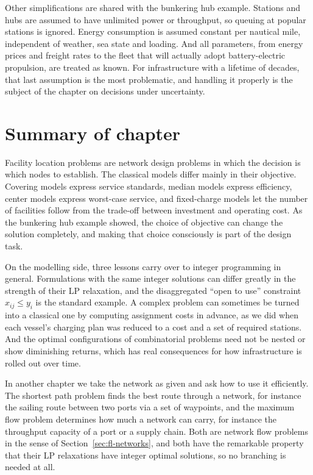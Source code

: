 Other simplifications are shared with the bunkering hub example. Stations and hubs are assumed to have unlimited power or throughput, so queuing at popular stations is ignored. Energy consumption is assumed constant per nautical mile, independent of weather, sea state and loading. And all parameters, from energy prices and freight rates to the fleet that will actually adopt battery-electric propulsion, are treated as known. For infrastructure with a lifetime of decades, that last assumption is the most problematic, and handling it properly is the subject of the chapter on decisions under uncertainty.

\section{Summary of chapter}
\label{sec:fl-summary}

Facility location problems are network design problems in which the decision is which nodes to establish. The classical models differ mainly in their objective. Covering models express service standards, median models express efficiency, center models express worst-case service, and fixed-charge models let the number of facilities follow from the trade-off between investment and operating cost. As the bunkering hub example showed, the choice of objective can change the solution completely, and making that choice consciously is part of the design task.

On the modelling side, three lessons carry over to integer programming in general. Formulations with the same integer solutions can differ greatly in the strength of their LP relaxation, and the disaggregated ``open to use'' constraint $x_{ij}\le y_i$ is the standard example. A complex problem can sometimes be turned into a classical one by computing assignment costs in advance, as we did when each vessel's charging plan was reduced to a cost and a set of required stations. And the optimal configurations of combinatorial problems need not be nested or show diminishing returns, which has real consequences for how infrastructure is rolled out over time.

In another chapter we take the network as given and ask how to use it efficiently. The shortest path problem finds the best route through a network, for instance the sailing route between two ports via a set of waypoints, and the maximum flow problem determines how much a network can carry, for instance the throughput capacity of a port or a supply chain. Both are network flow problems in the sense of Section~\ref{sec:fl-networks}, and both have the remarkable property that their LP relaxations have integer optimal solutions, so no branching is needed at all.
